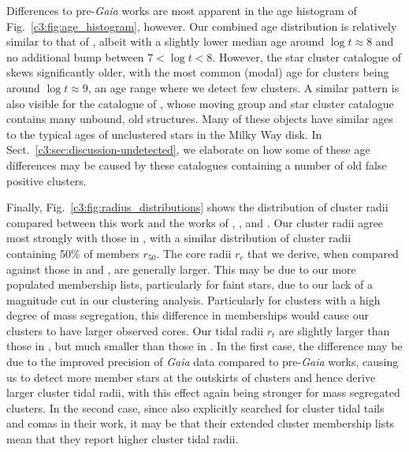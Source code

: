 Differences to pre-\emph{Gaia} works are most apparent in the age histogram of Fig.~\ref{c3:fig:age_histogram}, however. Our combined age distribution is relatively similar to that of \cite{cantat-gaudin_painting_2020}, albeit with a slightly lower median age around $\log t \approx 8$ and no additional bump between $7 < \log t < 8$. However, the star cluster catalogue of \cite{kharchenko_global_2013} skews significantly older, with the most common (modal) age for clusters being around $\log t \approx 9$, an age range where we detect few clusters. A similar pattern is also visible for the catalogue of \cite{kounkel_untangling_2020}, whose moving group and star cluster catalogue contains many unbound, old structures. Many of these objects have similar ages to the typical ages of unclustered stars in the Milky Way disk. In Sect.~\ref{c3:sec:discussion-undetected}, we elaborate on how some of these age differences may be caused by these catalogues containing a number of old false positive clusters. 

Finally, Fig.~\ref{c3:fig:radius_distributions} shows the distribution of cluster radii compared between this work and the works of \cite{kharchenko_global_2013}, \cite{tarricq_structural_2022}, and \cite{cantat-gaudin_clusters_2020}. Our cluster radii agree most strongly with those in \cite{cantat-gaudin_clusters_2020}, with a similar distribution of cluster radii containing 50\% of members $r_{50}$. The \cite{king_structure_1962} core radii $r_c$ that we derive, when compared against those in \cite{kharchenko_global_2013} and \cite{tarricq_structural_2022}, are generally larger. This may be due to our more populated membership lists, particularly for faint stars, due to our lack of a magnitude cut in our clustering analysis. Particularly for clusters with a high degree of mass segregation, this difference in memberships would cause our clusters to have larger observed cores. Our tidal radii $r_t$ are slightly larger than those in \cite{kharchenko_global_2013}, but much smaller than those in \cite{tarricq_structural_2022}. In the first case, the difference may be due to the improved precision of \emph{Gaia} data compared to pre-\emph{Gaia} works, causing us to detect more member stars at the outskirts of clusters and hence derive larger cluster tidal radii, with this effect again being stronger for mass segregated clusters. In the second case, since \cite{tarricq_structural_2022} also explicitly searched for cluster tidal tails and comas in their work, it may be that their extended cluster membership lists mean that they report higher cluster tidal radii.

